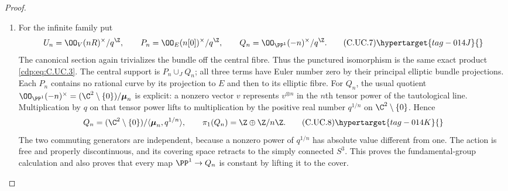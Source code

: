 \begin{proof}
\begin{enumerate}[label=\arabic*.,leftmargin=*]
\item For the infinite family put
\[
 U_n=\OO_V(nR)^\times/q^{\Z},\qquad
 P_n=\OO_E(n[0])^\times/q^{\Z},\qquad
 Q_n=\OO_{\PP^1}(-n)^\times/q^{\Z}.
\tag{C.UC.7}\hypertarget{tag-014J}{}\label{cdp:eq:C.UC.7}
\]
The canonical section again trivializes the
bundle off the central fibre. Thus the punctured
isomorphism is the same exact product \eqref{cdp:eq:C.UC.3}.
The central support is $P_n\cup_J Q_n$;
all three terms have Euler number zero by their
principal elliptic bundle projections. Each
$P_n$ contains no rational curve by its
projection to $E$ and then to its elliptic
fibre. For $Q_n$, the usual quotient
$\OO_{\PP^1}(-n)^\times
=(\C^2\setminus\{0\})/\boldsymbol\mu_n$
is explicit: a nonzero vector $v$ represents
$v^{\otimes n}$ in the $n$th tensor power of
the tautological line. Multiplication by $q$
on that tensor power lifts to multiplication
by the positive real number $q^{1/n}$ on
$\C^2\setminus\{0\}$. Hence
\[
 Q_n=(\C^2\setminus\{0\})/
       \langle\boldsymbol\mu_n,q^{1/n}\rangle,
 \qquad
 \pi_1(Q_n)=\Z\oplus\Z/n\Z.
\tag{C.UC.8}\hypertarget{tag-014K}{}\label{cdp:eq:C.UC.8}
\]
The two commuting generators are independent,
because a nonzero power of $q^{1/n}$ has
absolute value different from one. The action
is free and properly discontinuous, and its
covering space retracts to the simply connected
$S^3$. This proves the fundamental-group
calculation and also proves that every map
$\PP^1\to Q_n$ is constant by lifting it to
the cover.


\end{enumerate}
\end{proof}
